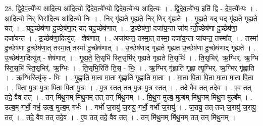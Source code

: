 \documentclass[17pt]{extarticle}
\begin{document}
28. द्वि॒दे॒व॒त्ये᳚भ्य आदि॒त्य आ॑दि॒त्यो द्वि॑देव॒त्ये᳚भ्यो द्विदेव॒त्ये᳚भ्य आदि॒त्यः । . द्वि॒दे॒व॒त्ये᳚भ्य॒ इति॑ द्वि - दे॒व॒त्ये᳚भ्यः । . आ॒दि॒त्यो निर् णिरा॑दि॒त्य आ॑दि॒त्यो निः । . निर् गृ॑ह्यते गृह्यते॒ निर् णिर् गृ॑ह्यते । . गृ॒ह्य॒ते॒ यद् यद् गृ॑ह्यते गृह्यते॒ यत् । . यदु॒च्छेष॑णा दु॒च्छेष॑णा॒द् यद् यदु॒च्छेष॑णात् । . उ॒च्छेष॑णा॒ दजा॑य॒न्ता जा॑य न्तो॒च्छेष॑णा दु॒च्छेष॑णा॒ दजा॑यन्त । . उ॒च्छेष॑णा॒दित्यु॑त् - शेष॑णात् । . अजा॑यन्त॒ तस्मा॒त् तस्मा॒ दजा॑य॒न्ता जा॑यन्त॒ तस्मा᳚त् । . तस्मा॑ दु॒च्छेष॑णा दु॒च्छेष॑णा॒त् तस्मा॒त् तस्मा॑ दु॒च्छेष॑णात् । . उ॒च्छेष॑णाद् गृह्यते गृह्यत उ॒च्छेष॑णा दु॒च्छेष॑णाद् गृह्यते । . उ॒च्छेष॑णा॒दित्यु॑त् - शेष॑णात् । . गृ॒ह्य॒ते॒ ति॒सृभि॑ स्ति॒सृभि॑र् गृह्यते गृह्यते ति॒सृभिः॑ । . ति॒सृभिर्॑. ऋ॒ग्भिर्. ऋ॒ग्भि स्ति॒सृभि॑ स्ति॒सृभिर्॑. ऋ॒ग्भिः । . ति॒सृभि॒रिति॑ ति॒सृ - भिः॒ । . ऋ॒ग्भिर् गृ॑ह्णाति गृह्णा त्यृ॒ग्भिर्. ऋ॒ग्भिर् गृ॑ह्णाति । . ऋ॒ग्भिरित्यृ॑क् - भिः । . गृ॒ह्णा॒ति॒ मा॒ता मा॒ता गृ॑ह्णाति गृह्णाति मा॒ता । . मा॒ता पि॒ता पि॒ता मा॒ता मा॒ता पि॒ता । . पि॒ता पु॒त्रः पु॒त्रः पि॒ता पि॒ता पु॒त्रः । . पु॒त्र स्तत् तत् पु॒त्रः पु॒त्र स्तत् । . तदे॒ वैव तत् तदे॒व । . ए॒व तत् तदे॒ वैव तत् । . तन् मि॑थु॒नम् मि॑थु॒नम् तत् तन् मि॑थु॒नम् । . मि॒थु॒न मुल्ब॒ मुल्ब॑म् मिथु॒नम् मि॑थु॒न मुल्ब᳚म् । . उल्ब॒म् गर्भो॒ गर्भ॒ उल्ब॒ मुल्ब॒म् गर्भः॑ । . गर्भो॑ ज॒रायु॑ ज॒रायु॒ गर्भो॒ गर्भो॑ ज॒रायु॑ । . ज॒रायु॒ तत् तज् ज॒रायु॑ ज॒रायु॒ तत् । . तदे॒ वैव तत् तदे॒व । . ए॒व तत् तदे॒ वैव तत् । . तन् मि॑थु॒नम् मि॑थु॒नम् तत् तन् मि॑थु॒नम् । \newline
\end{document}

